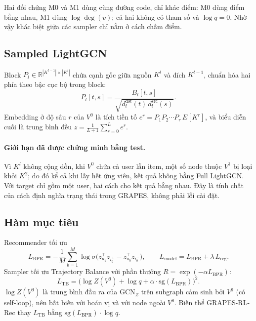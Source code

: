\documentclass[11pt,a4paper]{article}
\begin{document}
Hai đối chứng M0 và M1 dùng cùng đường code, chỉ khác điểm: M0 dùng điểm bằng nhau, M1 dùng $\log\deg(v)$; cả hai không có tham số và $\log q = 0$. Nhờ vậy khác biệt giữa các sampler chỉ nằm ở cách chấm điểm.

\subsection{Sampled LightGCN}
Block $P_l \in \mathbb{R}^{|K^{l-1}|\times|K^l|}$ chứa cạnh gốc giữa nguồn $K^l$ và đích $K^{l-1}$, chuẩn hóa hai phía theo bậc cục bộ trong block:
\[
P_l[t,s] = \frac{B_l[t,s]}{\sqrt{d^{\text{dst}}_l(t)\, d^{\text{src}}_l(s)}}.
\]
Embedding ở độ sâu $r$ của $V^0$ là tích tiền tố $e^{r} = P_1 P_2\cdots P_r\, E[K^r]$, và biểu diễn cuối là trung bình đều $z = \frac{1}{L+1}\sum_{r=0}^{L} e^{r}$.

\paragraph{Giới hạn đã được chứng minh bằng test.} Vì $K^l$ không cộng dồn, khi $V^0$ chứa cả user lẫn item, một số node thuộc $V^1$ bị loại khỏi $K^2$; do đó kể cả khi lấy hết ứng viên, kết quả không bằng Full LightGCN. Với target chỉ gồm một user, hai cách cho kết quả bằng nhau. Đây là tính chất của cách định nghĩa trạng thái trong GRAPES, không phải lỗi cài đặt.

\subsection{Hàm mục tiêu}
Recommender tối ưu
\[
L_{\text{BPR}} = -\frac{1}{M}\sum_{b=1}^{M}\log\sigma\big(z_{u_b}^\top z_{i_b^+} - z_{u_b}^\top z_{i_b^-}\big), \qquad L_{\text{model}} = L_{\text{BPR}} + \lambda\,L_{\text{reg}}.
\]
Sampler tối ưu Trajectory Balance \cite{tb} với phần thưởng $R = \exp(-\alpha L_{\text{BPR}})$:
\[
L_{\text{TB}} = \Big(\log Z(V^0) + \log q + \alpha\cdot\mathrm{sg}(L_{\text{BPR}})\Big)^2.
\]
$\log Z(V^0)$ là trung bình đầu ra của $\mathrm{GCN}_Z$ trên subgraph cảm sinh bởi $V^0$ (có self-loop), nên bất biến với hoán vị và với node ngoài $V^0$. Biến thể GRAPES-RL-Rec thay $L_{\text{TB}}$ bằng $\mathrm{sg}(L_{\text{BPR}})\cdot\log q$.
\end{document}
